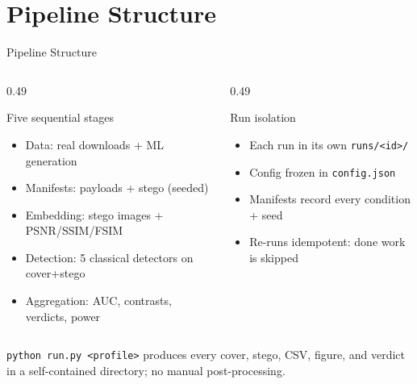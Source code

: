 \documentclass[aspectratio=169,11pt]{beamer}
\begin{document}
\section{Pipeline Structure}
\begin{frame}{Pipeline Structure}
\small
\begin{columns}[T]
\begin{column}{0.49\textwidth}
\begin{block}{Five sequential stages}
\begin{itemize}
\item Data: real downloads + ML generation
\item Manifests: payloads + stego (seeded)
\item Embedding: stego images + PSNR/SSIM/FSIM
\item Detection: 5 classical detectors on cover+stego
\item Aggregation: AUC, contrasts, verdicts, power
\end{itemize}
\end{block}
\end{column}
\begin{column}{0.49\textwidth}
\begin{block}{Run isolation}
\begin{itemize}
\item Each run in its own \texttt{runs/<id>/}
\item Config frozen in \texttt{config.json}
\item Manifests record every condition + seed
\item Re-runs idempotent: done work is skipped
\end{itemize}
\end{block}
\end{column}
\end{columns}
\vspace{0.05cm}
{\scriptsize\color{umgray}\texttt{python run.py <profile>} produces every cover, stego, CSV, figure, and verdict in a self-contained directory; no manual post-processing.}
\end{frame}

\end{document}
